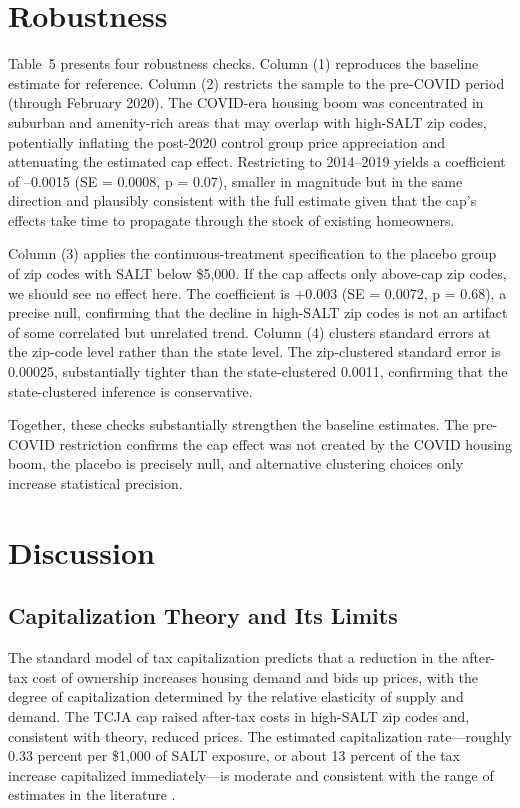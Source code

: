 \documentclass[12pt]{article}
\begin{document}
\section{Robustness}

Table~5 presents four robustness checks. Column (1) reproduces the baseline estimate for reference. Column (2) restricts the sample to the pre-COVID period (through February 2020). The COVID-era housing boom was concentrated in suburban and amenity-rich areas that may overlap with high-SALT zip codes, potentially inflating the post-2020 control group price appreciation and attenuating the estimated cap effect. Restricting to 2014--2019 yields a coefficient of --0.0015 (SE = 0.0008, p = 0.07), smaller in magnitude but in the same direction and plausibly consistent with the full estimate given that the cap's effects take time to propagate through the stock of existing homeowners.



Column (3) applies the continuous-treatment specification to the placebo group of zip codes with SALT below \$5,000. If the cap affects only above-cap zip codes, we should see no effect here. The coefficient is +0.003 (SE = 0.0072, p = 0.68), a precise null, confirming that the decline in high-SALT zip codes is not an artifact of some correlated but unrelated trend. Column (4) clusters standard errors at the zip-code level rather than the state level. The zip-clustered standard error is 0.00025, substantially tighter than the state-clustered 0.0011, confirming that the state-clustered inference is conservative.

Together, these checks substantially strengthen the baseline estimates. The pre-COVID restriction confirms the cap effect was not created by the COVID housing boom, the placebo is precisely null, and alternative clustering choices only increase statistical precision.

\section{Discussion}

\subsection{Capitalization Theory and Its Limits}

The standard model of tax capitalization \citep{Oates1969} predicts that a reduction in the after-tax cost of ownership increases housing demand and bids up prices, with the degree of capitalization determined by the relative elasticity of supply and demand. The TCJA cap raised after-tax costs in high-SALT zip codes and, consistent with theory, reduced prices. The estimated capitalization rate---roughly 0.33 percent per \$1,000 of SALT exposure, or about 13 percent of the tax increase capitalized immediately---is moderate and consistent with the range of estimates in the literature \citep{Kuminoff2020, ZoecklerSommer2022}.
\end{document}
